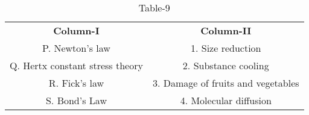 \begin{table}[htbp]
  \centering
  \caption{Table-9}
  \label{table9}
  \begin{tabular}{cc}
\textbf{Column-I} & \textbf{Column-II}\\

P. Newton's law & 1. Size reduction  \\
Q. Hertx constant stress theory & 2. Substance cooling \\
R. Fick's law & 3. Damage of fruits and vegetables \\
S. Bond's Law & 4. Molecular diffusion \\
  
  
  
  \end{tabular}
\end{table}